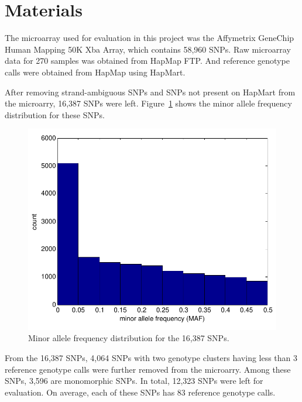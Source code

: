 \documentclass{scrartcl}
\begin{document}
\section{Materials}

\par
The microarray used for evaluation in this project was the Affymetrix GeneChip
Human Mapping 50K Xba Array, which contains 58,960 SNPs.
Raw microarray data for 270 samples was obtained from HapMap FTP.
And reference genotype calls were obtained from HapMap using HapMart.

\par
After removing strand-ambiguous SNPs and SNPs not present on HapMart from
the microarry, 16,387 SNPs were left.
Figure~\ref{fig:data_maf_dist} shows the minor allele frequency distribution
for these SNPs.

\begin{figure}[H]
\centering
\includegraphics[scale=0.75]
{data_figs/maf_dist.pdf}
\caption{Minor allele frequency distribution for the 16,387 SNPs.}
\label{fig:data_maf_dist}
\end{figure}


\par
From the 16,387 SNPs, 4,064 SNPs with two genotype clusters having less than
3 reference genotype calls were further removed from the microarry.
Among these SNPs, 3,596 are monomorphic SNPs.
In total, 12,323 SNPs were left for evaluation.
On average, each of these SNPs has 83 reference genotype calls.
\end{document}
